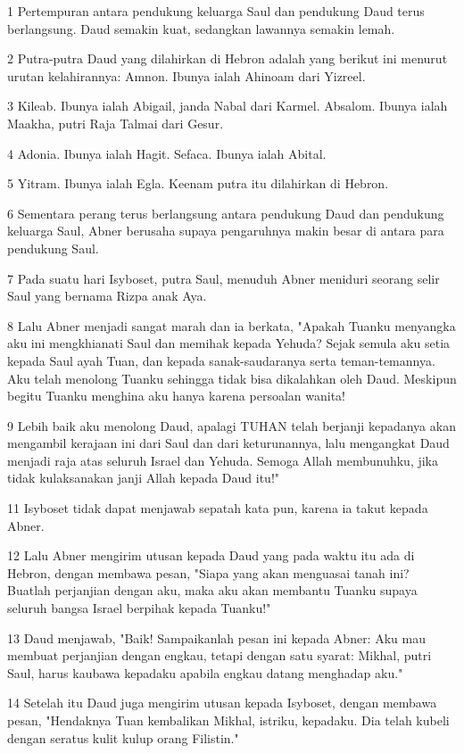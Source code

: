 \par 1 Pertempuran antara pendukung keluarga Saul dan pendukung Daud terus berlangsung. Daud semakin kuat, sedangkan lawannya semakin lemah.
\par 2 Putra-putra Daud yang dilahirkan di Hebron adalah yang berikut ini menurut urutan kelahirannya: Amnon. Ibunya ialah Ahinoam dari Yizreel.
\par 3 Kileab. Ibunya ialah Abigail, janda Nabal dari Karmel. Absalom. Ibunya ialah Maakha, putri Raja Talmai dari Gesur.
\par 4 Adonia. Ibunya ialah Hagit. Sefaca. Ibunya ialah Abital.
\par 5 Yitram. Ibunya ialah Egla. Keenam putra itu dilahirkan di Hebron.
\par 6 Sementara perang terus berlangsung antara pendukung Daud dan pendukung keluarga Saul, Abner berusaha supaya pengaruhnya makin besar di antara para pendukung Saul.
\par 7 Pada suatu hari Isyboset, putra Saul, menuduh Abner meniduri seorang selir Saul yang bernama Rizpa anak Aya.
\par 8 Lalu Abner menjadi sangat marah dan ia berkata, "Apakah Tuanku menyangka aku ini mengkhianati Saul dan memihak kepada Yehuda? Sejak semula aku setia kepada Saul ayah Tuan, dan kepada sanak-saudaranya serta teman-temannya. Aku telah menolong Tuanku sehingga tidak bisa dikalahkan oleh Daud. Meskipun begitu Tuanku menghina aku hanya karena persoalan wanita!
\par 9 Lebih baik aku menolong Daud, apalagi TUHAN telah berjanji kepadanya akan mengambil kerajaan ini dari Saul dan dari keturunannya, lalu mengangkat Daud menjadi raja atas seluruh Israel dan Yehuda. Semoga Allah membunuhku, jika tidak kulaksanakan janji Allah kepada Daud itu!"
\par 11 Isyboset tidak dapat menjawab sepatah kata pun, karena ia takut kepada Abner.
\par 12 Lalu Abner mengirim utusan kepada Daud yang pada waktu itu ada di Hebron, dengan membawa pesan, "Siapa yang akan menguasai tanah ini? Buatlah perjanjian dengan aku, maka aku akan membantu Tuanku supaya seluruh bangsa Israel berpihak kepada Tuanku!"
\par 13 Daud menjawab, "Baik! Sampaikanlah pesan ini kepada Abner: Aku mau membuat perjanjian dengan engkau, tetapi dengan satu syarat: Mikhal, putri Saul, harus kaubawa kepadaku apabila engkau datang menghadap aku."
\par 14 Setelah itu Daud juga mengirim utusan kepada Isyboset, dengan membawa pesan, "Hendaknya Tuan kembalikan Mikhal, istriku, kepadaku. Dia telah kubeli dengan seratus kulit kulup orang Filistin."
